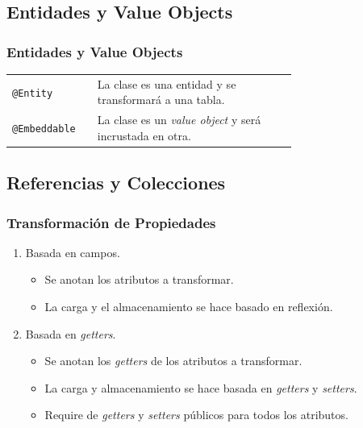 \documentclass[a4paper,slidestop,xcolor=pst,blue]{beamer}
\newcommand{\ann}[1]{\color{blue}\texttt{#1}\color{black}}
\begin{document}
\subsection{Entidades y Value Objects}

\begin{frame}[c]
    \frametitle{Entidades y Value Objects}
    \begin{tabular}{lp{0.70\linewidth}}
        \ann{@Entity}     & La clase es una entidad y se transformará a una tabla. \\
        \ann{@Embeddable} & La clase es un \emph{value object} y será incrustada en otra.
    \end{tabular}
\end{frame}

\subsection{Referencias y Colecciones}

\begin{frame}[c]
    \frametitle{Transformación de Propiedades}
    \begin{enumerate}[<+->]
        \item<1-> Basada en campos.
            \begin{itemize}
                \item<2-> Se anotan los atributos a transformar.
                \item<3-> La carga y el almacenamiento se hace basado en reflexión.
            \end{itemize}
        \item<3-> Basada en \emph{getters}.
            \begin{itemize}
                \item<4-> Se anotan los \emph{getters} de los atributos a transformar.
                \item<5-> La carga y almacenamiento se hace basada en \emph{getters} y \emph{setters}.
                \item<6-> Require de \emph{getters} y \emph{setters} públicos para todos los atributos.
            \end{itemize}
    \end{enumerate}
\end{frame}
\end{document}
